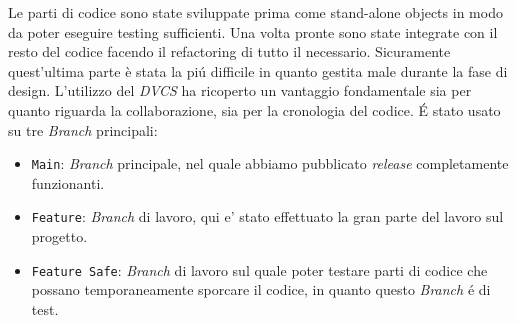 \documentclass[a4paper,12pt]{report}
\begin{document}
Le parti di codice sono state sviluppate prima come stand-alone objects in modo da poter eseguire testing sufficienti. Una volta pronte sono state integrate con il resto del codice facendo il refactoring di tutto il necessario. Sicuramente quest’ultima parte è stata la piú difficile in quanto gestita male durante la fase di design.
L'utilizzo del \emph{DVCS} ha ricoperto un vantaggio fondamentale sia per quanto riguarda la collaborazione, sia per la cronologia del codice.
É stato usato su tre \emph{Branch} principali:
\begin{itemize}
    \item \texttt{Main}: \emph{Branch} principale, nel quale abbiamo pubblicato \emph{release} completamente funzionanti.
    \item \texttt{Feature}: \emph{Branch} di lavoro, qui e' stato effettuato la gran parte del lavoro sul progetto.
    \item \texttt{Feature Safe}: \emph{Branch} di lavoro sul quale poter testare parti di codice che possano temporaneamente sporcare il codice, in quanto questo \emph{Branch} é di test.
\end{itemize}
\end{document}
